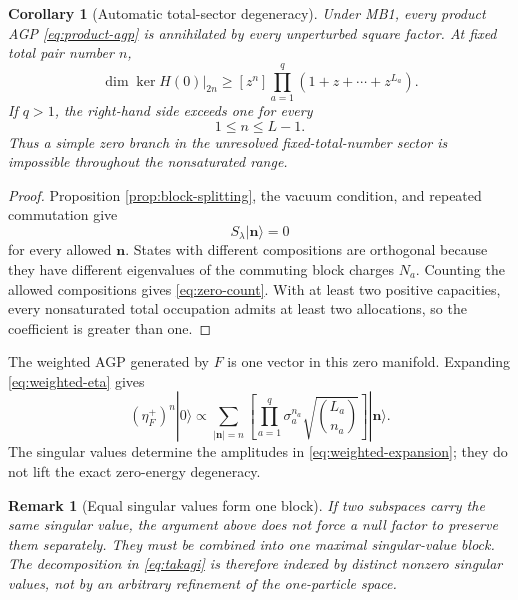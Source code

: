 \documentclass[11pt]{article}
\numberwithin{equation}{section}
\newtheorem{corollary}[theorem]{Corollary}
\newtheorem{remark}[theorem]{Remark}
\newcommand{\bn}{\mathbf n}
\begin{document}
\begin{corollary}[Automatic total-sector degeneracy]
\label{cor:degeneracy}
Under MB1, every product AGP \eqref{eq:product-agp} is annihilated by every unperturbed square factor.  At fixed total pair number $n$,
\begin{equation}
 \dim\ker H(0)\big|_{2n}
 \ge [z^n]\prod_{a=1}^q(1+z+\cdots+z^{L_a}).
 \label{eq:zero-count}
\end{equation}
If $q>1$, the right-hand side exceeds one for every
\begin{equation}
 1\le n\le L-1.
 \label{eq:nonsaturated}
\end{equation}
Thus a simple zero branch in the unresolved fixed-total-number sector is impossible throughout the nonsaturated range.
\end{corollary}

\begin{proof}
Proposition \ref{prop:block-splitting}, the vacuum condition, and repeated commutation give
\begin{equation}
 S_\lambda|\bn\rangle=0
 \label{eq:all-product-zero}
\end{equation}
for every allowed $\bn$.  States with different compositions are orthogonal because they have different eigenvalues of the commuting block charges $N_a$.  Counting the allowed compositions gives \eqref{eq:zero-count}.  With at least two positive capacities, every nonsaturated total occupation admits at least two allocations, so the coefficient is greater than one.
\end{proof}

The weighted AGP generated by $F$ is one vector in this zero manifold.  Expanding \eqref{eq:weighted-eta} gives
\begin{equation}
 (\eta_F^+)^n|0\rangle
 \propto
 \sum_{|\bn|=n}
 \left[
 \prod_{a=1}^q
 \sigma_a^{n_a}\sqrt{\binom{L_a}{n_a}}
 \right]
 |\bn\rangle.
 \label{eq:weighted-expansion}
\end{equation}
The singular values determine the amplitudes in \eqref{eq:weighted-expansion}; they do not lift the exact zero-energy degeneracy.

\begin{remark}[Equal singular values form one block]
If two subspaces carry the same singular value, the argument above does not force a null factor to preserve them separately.  They must be combined into one maximal singular-value block.  The decomposition in \eqref{eq:takagi} is therefore indexed by distinct nonzero singular values, not by an arbitrary refinement of the one-particle space.
\end{remark}
\end{document}
